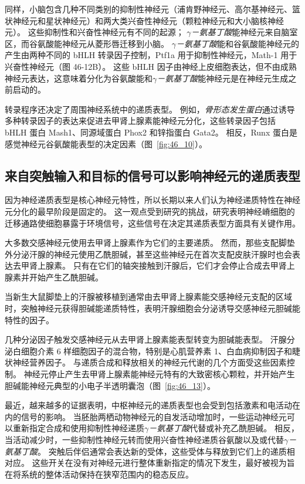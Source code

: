 同样，小脑包含几种不同类别的抑制性神经元（浦肯野神经元、高尔基神经元、篮状神经元和星状神经元）和两大类兴奋性神经元（颗粒神经元和大小脑核神经元）。
这些抑制性和兴奋性神经元有不同的起源；
\textit{$\gamma$－氨基丁酸}能神经元来自脑室区，而谷氨酸能神经元从菱形唇迁移到小脑。
\textit{$\gamma$－氨基丁酸}能和谷氨酸能神经元的产生由两种不同的 bHLH 转录因子控制，Ptf1a 用于抑制性神经元，Math-1 用于兴奋性神经元（图 46-12B）。
这些 bHLH 因子由神经上皮细胞表达，但不由成熟神经元表达，这意味着分化为谷氨酸能和\textit{$\gamma$－氨基丁酸}能神经元是在神经元生成之前启动的。


转录程序还决定了周围神经系统中的递质表型。
例如，\textit{骨形态发生蛋白}通过诱导多种转录因子的表达来促进去甲肾上腺素能神经元分化，这些转录因子包括 bHLH 蛋白 Mash1、同源域蛋白 Phox2 和锌指蛋白 Gata2。
相反，Runx 蛋白是感觉神经元谷氨酸能表型的决定因素（图~\ref{fig:46_10}）。



\subsection{来自突触输入和目标的信号可以影响神经元的递质表型}

因为神经递质表型是核心神经元特性，所以长期以来人们认为神经递质特性在神经元分化的最早阶段是固定的。
这一观点受到研究的挑战，研究表明神经嵴细胞的迁移通路使细胞暴露于环境信号，这些信号在决定其递质表型方面具有关键作用。


大多数交感神经元使用去甲肾上腺素作为它们的主要递质。
然而，那些支配脚垫外分泌汗腺的神经元使用乙酰胆碱，甚至这些神经元在首次支配皮肤汗腺时也会表达去甲肾上腺素。
只有在它们的轴突接触到汗腺后，它们才会停止合成去甲肾上腺素并开始产生乙酰胆碱。


当新生大鼠脚垫上的汗腺被移植到通常由去甲肾上腺素能交感神经元支配的区域时，突触神经元获得胆碱能递质特性，表明汗腺细胞会分泌诱导交感神经元胆碱能特性的因子。


几种分泌因子触发交感神经元从去甲肾上腺素能表型转变为胆碱能表型。
汗腺分泌白细胞介素 6 样细胞因子的混合物，特别是心肌营养素 1、白血病抑制因子和睫状神经营养因子。
与递质合成和释放相关的神经元代谢的几个方面受这些因素控制。
神经元停止产生去甲肾上腺素能神经元特有的大致密核心颗粒，并开始产生胆碱能神经元典型的小电子半透明囊泡（图~\ref{fig:46_13}）。


最近，越来越多的证据表明，中枢神经元的递质表型也会受到包括激素和电活动在内的信号的影响。
当胚胎两栖动物神经元的自发活动增加时，一些运动神经元可以重新指定合成和使用抑制性神经递质\textit{$\gamma$－氨基丁酸}代替或补充乙酰胆碱。
相反，当活动减少时，一些抑制性神经元转而使用兴奋性神经递质谷氨酸以及或代替\textit{$\gamma$－氨基丁酸}。
突触后伴侣通常会表达新的受体，这些受体与释放到它们上的递质相对应。
这些开关在没有对神经元进行整体重新指定的情况下发生，最好被视为旨在将系统的整体活动保持在狭窄范围内的稳态反应。


